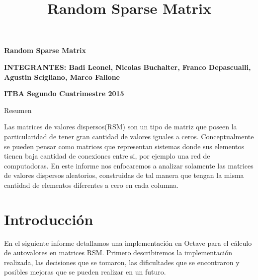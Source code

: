 \documentclass[a4paper,10pt,spanish]{article}
\title{Random Sparse Matrix}
\begin{document}
\begin{center}
\textbf{\Huge{Random Sparse Matrix}}
\end{center}

\vspace{10mm}

\begin{center}
\textbf{INTEGRANTES: Badi Leonel, Nicolas Buchalter, Franco Depascualli, Agustin Scigliano, Marco Fallone}

\textbf{ITBA Segundo Cuatrimestre 2015}
\end{center}

\begin{center}
\end{center}

\vspace{10mm}

\begin{center}
\begin{large}
Resumen
\end{large}
\end{center}

Las matrices de valores dispersos(RSM) son un tipo de matriz que poseen la particularidad de tener gran cantidad de valores iguales a ceros. Conceptualmente se pueden pensar como matrices que representan sistemas donde sus elementos tienen baja cantidad de conexiones entre si, por ejemplo una red de computadoras. En este informe nos enfocaremos a analizar solamente las matrices de valores dispersos aleatorios, construidas de tal manera que tengan la misma cantidad de elementos diferentes a cero en cada columna.

\section{Introducción}
En el siguiente informe detallamos una implementación en Octave para el cálculo de autovalores en matrices RSM. Primero describiremos la implementación realizada, las decisiones que se tomaron, las dificultades que se encontraron y posibles mejoras que se pueden realizar en un futuro.
\end{document}
